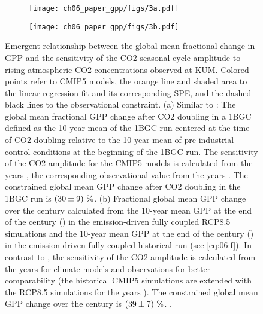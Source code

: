 \begin{figure}[t]
  \centering
  \begin{subfigure}[b]{0.37\columnwidth}
    \texttt{[image: ch06\_paper\_gpp/figs/3a.pdf]}
    \caption{}
    \label{fig:06:step1:a}
  \end{subfigure}
  \begin{subfigure}[b]{0.37\columnwidth}
    \texttt{[image: ch06\_paper\_gpp/figs/3b.pdf]}
    \caption{}
    \label{fig:06:step1:b}
  \end{subfigure}
  \begin{subfigure}[b]{0.24\columnwidth}
  \end{subfigure}
  \caption[
    Emergent relationship between the global mean fractional change in
    \acf{GPP} and the sensitivity of the \acs{CO2} seasonal cycle amplitude to
    rising atmospheric \acs{CO2} concentrations observed at \acl{KUM}.
  ]{
    Emergent relationship between the global mean fractional change in
    \acf{GPP} and the sensitivity of the \acs{CO2} seasonal cycle amplitude to
    rising atmospheric \acs{CO2} concentrations observed at \acf{KUM}. Colored
    points refer to \acs{CMIP}5 models, the orange line and shaded area to the
    linear regression fit and its corresponding \acl{SPE}, and the dashed black
    lines to the observational constraint. (a) Similar to
    \textcite{Wenzel2016}: The global mean fractional \acs{GPP} change after
    \acs{CO2} doubling in a \acf{1BGC} defined as the 10-year mean of the
    \acs{1BGC} run centered at the time of \acs{CO2} doubling relative to the
    10-year mean of pre-industrial control conditions at the beginning of the
    \acs{1BGC} run. The sensitivity of the \acs{CO2} amplitude for the
    \acs{CMIP}5 models is calculated from the years , the
    corresponding observational value from the years . The
    constrained global mean \acs{GPP} change after \acs{CO2} doubling in the
    \acs{1BGC} run is $\pmrangeunit{30}{9}{\%}$. (b) Fractional global mean
    \acs{GPP} change over the  century calculated from the 10-year mean
    \acs{GPP} at the end of the  century () in the
    emission-driven fully coupled \acs{RCP}8.5 simulations and the 10-year mean
    \acs{GPP} at the end of the  century () in the
    emission-driven fully coupled historical run (see \cref{eq:06:f}). In
    contrast to \textcite{Wenzel2016}, the sensitivity of the \acs{CO2}
    amplitude is calculated from the years  for climate
    models and observations for better comparability (the historical
    \acs{CMIP}5 simulations are extended with the \acs{RCP}8.5 simulations for
    the years ). The constrained global mean \acs{GPP} change
    over the  century is $\pmrangeunit{39}{7}{\%}$.
    .
  }
  \label{fig:06:step1}
\end{figure}

